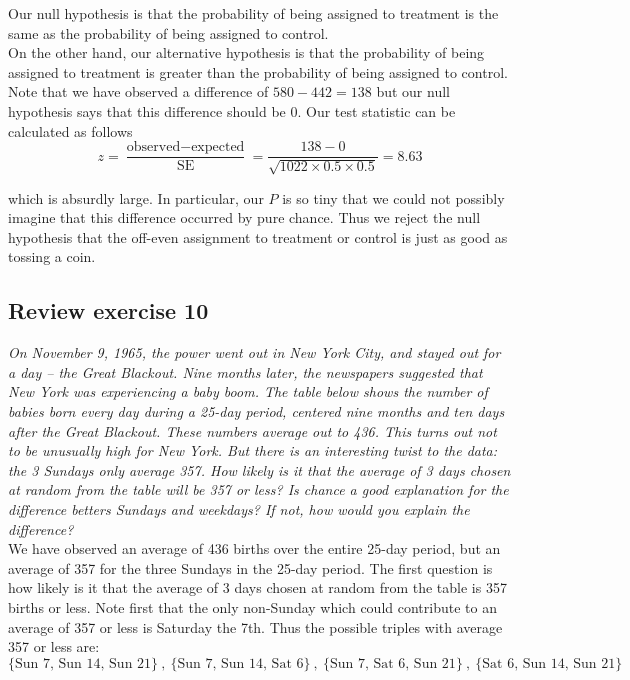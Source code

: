 \documentclass[11pt]{article}
\begin{document}
\noindent Our null hypothesis is that the probability of being assigned to treatment is the same as the probability of being assigned to control. \\

\noindent On the other hand, our alternative hypothesis is that the probability of being assigned to treatment is greater than the probability of being assigned to control. Note that we have observed a difference of $580 - 442 = 138$ but our null hypothesis says that this difference should be 0. Our test statistic can be calculated as follows
$$z = \frac{\text{observed} - \text{expected}}{\text{SE}} = \frac{138 - 0}{\sqrt{1022 \times 0.5 \times 0.5}} = 8.63 $$

\noindent which is absurdly large. In particular, our $P$ is so tiny that we could not possibly imagine that this difference occurred by pure chance. Thus we reject the null hypothesis that the off-even assignment to treatment or control is just as good as tossing a coin.


\subsection*{Review exercise 10} %
\noindent \emph{On November 9, 1965, the power went out in New York City, and stayed out for a day -- the Great Blackout. Nine months later, the newspapers suggested that New York was experiencing a baby boom. The table below shows the number of babies born every day during a 25-day period, centered nine months and ten days after the Great Blackout. These numbers average out to 436. This turns out not to be unusually high for New York. But there is an interesting twist to the data: the 3 Sundays only average 357. How likely is it that the average of 3 days chosen at random from the table will be 357 or less? Is chance a good explanation for the difference betters Sundays and weekdays? If not, how would you explain the difference?}\\

\noindent We have observed an average of 436 births over the entire 25-day period, but an average of 357 for the three Sundays in the 25-day period. The first question is how likely is it that the average of 3 days chosen at random from the table is 357 births or less. Note first that the only non-Sunday which could contribute to an average of 357 or less is Saturday the 7th. Thus the possible triples with average 357 or less are:
$$\{\text{Sun 7, Sun 14, Sun 21}\}~,~ \{\text{Sun 7, Sun 14, Sat 6}\}~,~ \{\text{Sun 7, Sat 6, Sun 21}\}~,~ \{\text{Sat 6, Sun 14, Sun 21}\}$$
\end{document}
